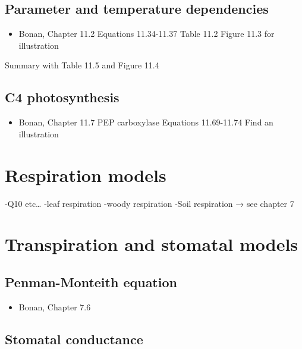 \documentclass[oneside]{book}
\providecommand{\tightlist}{%
  \setlength{\itemsep}{0pt}\setlength{\parskip}{0pt}}
\begin{document}
\subsection{Parameter and temperature
dependencies}\label{parameter-and-temperature-dependencies}

\begin{itemize}
\tightlist
\item
  Bonan, Chapter 11.2 Equations 11.34-11.37 Table 11.2 Figure 11.3 for
  illustration
\end{itemize}

Summary with Table 11.5 and Figure 11.4

\subsection{C4 photosynthesis}\label{c4-photosynthesis}

\begin{itemize}
\tightlist
\item
  Bonan, Chapter 11.7 PEP carboxylase Equations 11.69-11.74 Find an
  illustration
\end{itemize}

\section{Respiration models}\label{respiration-models}

-Q10 etc\ldots{} -leaf respiration -woody respiration -Soil respiration
→ see chapter 7

\section{Transpiration and stomatal
models}\label{transpiration-and-stomatal-models}

\subsection{Penman-Monteith equation}\label{penman-monteith-equation}

\begin{itemize}
\tightlist
\item
  Bonan, Chapter 7.6
\end{itemize}

\subsection{Stomatal conductance}\label{stomatal-conductance}
\end{document}
